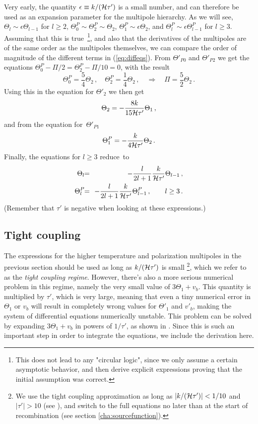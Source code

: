 \documentclass[twocolumn,nofootinbib,amsmath,amssymb]{revtex4}
\newcommand{\be}{\begin{equation}}
\newcommand{\ee}{\end{equation}}
\newcommand{\ba}{\begin{eqnarray}}
\newcommand{\ea}{\end{eqnarray}}
\newcommand{\hs}{\hspace{-1.12mm}}
\newcommand{\eq}{\hs & = & \hs}
\begin{document}
Very early, the quantity $\epsilon \equiv k/({\cal H} \tau')$ is a small
number, and can therefore be used as an expansion parameter for the multipole
hierarchy. As we will see, $\Theta_l \sim \epsilon \Theta_{l-1}$ for $l \geq
2$, $\Theta^P_0 \sim \Theta^P_2 \sim \Theta_2$, $\Theta^P_1 \sim \epsilon
\Theta_2$, and $\Theta^P_l \sim \epsilon \Theta^P_{l-1}$ for $l \geq 3$.
Assuming that this is true~\footnote{This does not lead to any "circular
logic", since we only assume a certain asymptotic behavior, and then derive
explicit expressions proving that the initial assumption was correct.}, and
also that the derivatives of the multipoles are of the same order as the
multipoles themselves, we can compare the order of magnitude of the different
terms in (\ref{eq:diffeqs}). From $\Theta'_{P0}$ and $\Theta'_{P2}$ we get the
equations $\Theta^P_0 - \Pi/2 = \Theta^P_2 - \Pi/10 = 0$, with the result
\be
  \Theta^P_0 = \frac{5}{4} \Theta_2 \, , \quad
  \Theta^P_2 = \frac{1}{4} \Theta_2 \, , \quad \Rightarrow \quad
  \Pi = \frac{5}{2} \Theta_2 \, .
\ee
Using this in the equation for $\Theta'_2$ we then get
\be
  \Theta_2 = -\frac{8k}{15{\cal H}\tau'} \Theta_1 \, ,
  \label{eq:theta2_tightcoupling}
\ee
and from the equation for~$\Theta'_{P1}$
\be
  \Theta^P_1 = -\frac{k}{4{\cal H}\tau'} \Theta_2 \, .
\ee
Finally, the equations for $l \geq 3$ reduce~to
\ba
  \Theta_l \eq -\frac{l}{2l+1} \frac{k}{{\cal H}\tau'} \Theta_{l-1} \, ,
    \nonumber \\
  \Theta^P_l \eq -\frac{l}{2l+1} \frac{k}{{\cal H}\tau'} \Theta^P_{l-1} \, ,
  \qquad l \geq 3 \, .
\ea
(Remember that $\tau'$ is negative when looking at these expressions.)


\subsection{Tight coupling}

The expressions for the higher temperature and polarization multipoles in the
previous section should be used as long as $k/({\cal H}\tau')$ is small
\footnote{We use the tight coupling approximation as long as $|k/({\cal
H}\tau')| < 1/10$ and $|\tau'| > 10$ (see \cite{Doran}), and switch to the full
equations no later than at the start of recombination (see section
\ref{cha:sourcefunction}).}, which we refer to as the \textit{tight coupling
regime}. However, there's also a more serious numerical problem in this regime,
namely the very small value of $3\Theta_1 + v_b$. This quantity is multiplied
by $\tau'$, which is very large, meaning that even a tiny numerical error in
$\Theta_1$ or $v_b$ will result in completely wrong values for $\Theta'_1$ and
$v'_b$, making the system of differential equations numerically unstable. This
problem can be solved by expanding $3\Theta_1 + v_b$ in powers of $1/\tau'$, as
shown in \cite{Ma_Bert, Doran}. Since this is such an important step in order
to integrate the equations, we include the derivation here.
\end{document}
